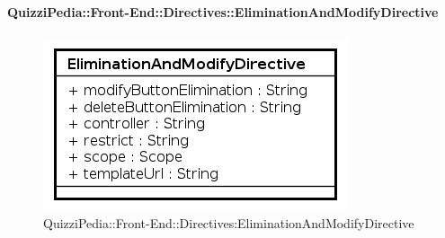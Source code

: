 \paragraph[QuizziPedia::Front-End::Directives\\::EliminationAndModifyDirective]{QuizziPedia::Front-End::Directives::EliminationAndModifyDirective}
\begin{figure} [ht]
	\centering
	\includegraphics[scale=0.80]{UML/Classi/Front-End/QuizziPedia_Front-end_EliminationAndModifyDirective.png}
	\caption{QuizziPedia::Front-End::Directives:EliminationAndModifyDirective}
\end{figure} \FloatBarrier
